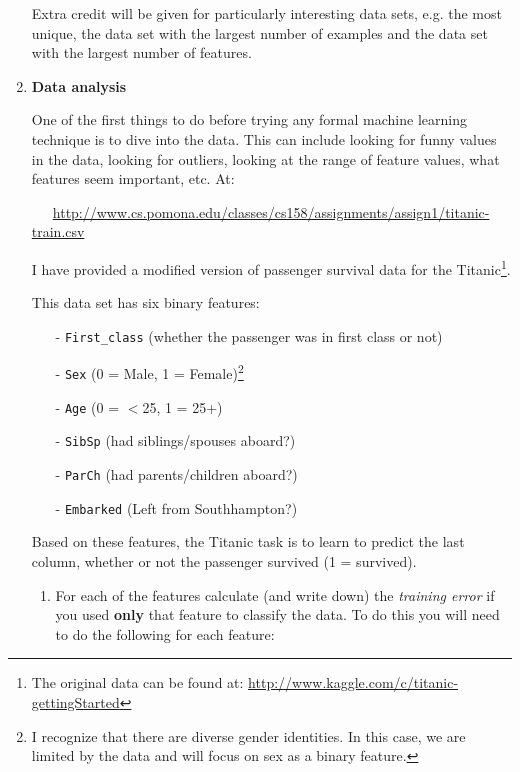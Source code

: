 \documentclass[11pt]{article}
\begin{document}
\begin{enumerate}
\begin{enumerate}
\end{enumerate}

Extra credit will be given for particularly interesting data sets, e.g. the most unique, the data set with the largest number of examples and the data set with the largest number of features.

\item \textbf{Data analysis}

One of the first things to do before trying any formal machine learning technique is to dive into the data.  This can include looking for funny values in the data, looking for outliers, looking at the range of feature values, what features seem important, etc.  At:

\mbox{~~~}\url{http://www.cs.pomona.edu/classes/cs158/assignments/assign1/titanic-train.csv}


I have provided a modified version of passenger survival data for the Titanic\footnote{The original data can be found at: \url{http://www.kaggle.com/c/titanic-gettingStarted}}.

This data set has six binary features:  

\begin{itemize}
\item[-] \texttt{First\_class} (whether the passenger was in first class or not)
\item[-] \texttt{Sex} (0 = Male, 1 = Female)\footnote{I recognize that there are diverse gender identities.  In this case, we are limited by the data and will focus on sex as a binary feature.}
\item[-] \texttt{Age} (0 = $<$25, 1 = 25+)
\item[-] \texttt{SibSp} (had siblings/spouses aboard?)
\item[-] \texttt{ParCh} (had parents/children aboard?)
\item[-] \texttt{Embarked} (Left from Southhampton?)
\end{itemize}

Based on these features, the Titanic task is to learn to predict the last column, whether or not the passenger survived (1 = survived).

\begin{enumerate}

\item For each of the features calculate (and write down) the \emph{training error} if you used \textbf{only} that feature to classify the data.  To do this you will need to do the following for each feature:


\end{enumerate}
\end{enumerate}
\end{document}
